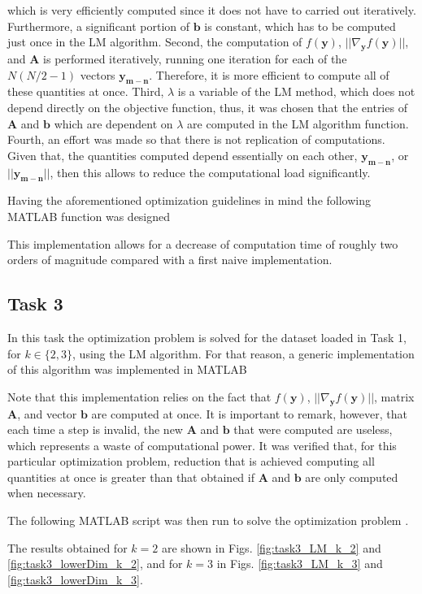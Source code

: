\documentclass[12pt]{article}
\begin{document}
which is very efficiently computed since it does not have to carried out iteratively. Furthermore, a significant portion of $\mathbf{b}$ is constant, which has to be computed just once in the LM algorithm. Second, the computation of $f(\mathbf{y})$, $||\nabla_{\mathbf{y}} f(\mathbf{y})||$, and $\mathbf{A}$ is performed iteratively, running one iteration for each of the $N(N/2-1)$ vectors $\mathbf{y_{m-n}}$. Therefore, it is more efficient to compute all of these quantities at once. Third, $\lambda$ is a variable of the LM method, which does not depend directly on the objective function, thus, it was chosen that the entries of $\mathbf{A}$ and $\mathbf{b}$ which are dependent on $\lambda$ are computed in the LM algorithm function. Fourth, an effort was made so that there is not replication of computations. Given that, the quantities computed depend essentially on each other, $\mathbf{y_{m-n}}$, or $||\mathbf{y_{m-n}}||$, then this allows to reduce the computational load significantly.

Having the aforementioned optimization guidelines in mind the following MATLAB function was designed

This implementation allows for a decrease of computation time of roughly two orders of magnitude compared with a first naive implementation.

\subsection{Task 3}
In this task the optimization problem is solved for the dataset loaded in Task 1, for $k \in \{2,3\}$, using the LM algorithm. For that reason, a generic implementation of this algorithm was implemented in MATLAB

Note that this implementation relies on the fact that $f(\mathbf{y})$, $||\nabla_{\mathbf{y}} f(\mathbf{y})||$, matrix $\mathbf{A}$, and vector $\mathbf{b}$ are computed at once. It is important to remark, however, that each time a step is invalid, the new $\mathbf{A}$ and $\mathbf{b}$ that were computed are useless, which represents a waste of computational power. It was verified that, for this particular optimization problem, reduction that is achieved computing all quantities at once is greater than that obtained if $\mathbf{A}$ and $\mathbf{b}$ are only computed when necessary.

The following MATLAB script was then run to solve the optimization problem 
.

The results obtained for $k=2$ are shown in Figs. \ref{fig:task3_LM_k_2} and \ref{fig:task3_lowerDim_k_2}, and for $k=3$ in Figs. \ref{fig:task3_LM_k_3} and \ref{fig:task3_lowerDim_k_3}.
\end{document}
